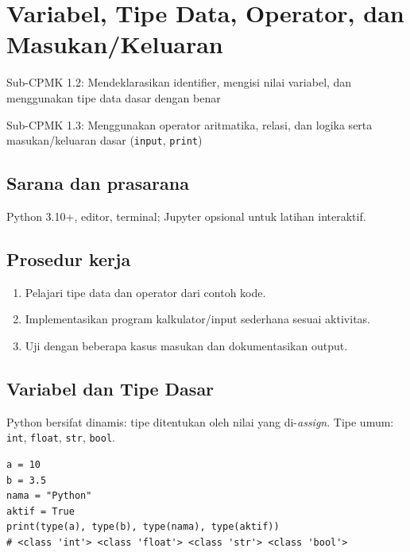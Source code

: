 \documentclass[../main.tex]{subfiles}
\begin{document}
\chapter{Variabel, Tipe Data, Operator, dan Masukan/Keluaran}

\begin{subcpmk}
  \item Sub-CPMK 1.2: Mendeklarasikan identifier, mengisi nilai variabel, dan menggunakan tipe data dasar dengan benar
  \item Sub-CPMK 1.3: Menggunakan operator aritmatika, relasi, dan logika serta masukan/keluaran dasar (\texttt{input}, \texttt{print})
\end{subcpmk}


\section{Sarana dan prasarana}

Python 3.10+, editor, terminal; Jupyter opsional untuk latihan interaktif.

\section{Prosedur kerja}

\begin{enumerate}[leftmargin=*]
  \item Pelajari tipe data dan operator dari contoh kode.
  \item Implementasikan program kalkulator/input sederhana sesuai aktivitas.
  \item Uji dengan beberapa kasus masukan dan dokumentasikan output.
\end{enumerate}

\section{Variabel dan Tipe Dasar}

Python bersifat dinamis: tipe ditentukan oleh nilai yang di-\textit{assign}. Tipe umum: \texttt{int}, \texttt{float}, \texttt{str}, \texttt{bool}.

\begin{lstlisting}[caption=Variabel dan tipe]
a = 10
b = 3.5
nama = "Python"
aktif = True
print(type(a), type(b), type(nama), type(aktif))
# <class 'int'> <class 'float'> <class 'str'> <class 'bool'>
\end{lstlisting}
\end{document}

